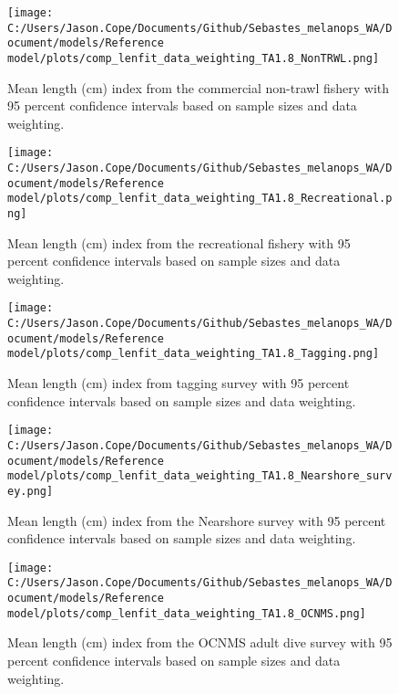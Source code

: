 \documentclass[11pt,
  english,
  letterpaper,
]{article}
\begin{document}
\pagebreak

\begin{figure}
\centering
\texttt{[image: C:/Users/Jason.Cope/Documents/Github/Sebastes\_melanops\_WA/Document/models/Reference model/plots/comp\_lenfit\_data\_weighting\_TA1.8\_NonTRWL.png]}
\caption{Mean length (cm) index from the commercial non-trawl fishery with 95 percent confidence intervals based on sample sizes and data weighting.\label{fig:nontrawl-mean-len-fit}}
\end{figure}

\pagebreak

\begin{figure}
\centering
\texttt{[image: C:/Users/Jason.Cope/Documents/Github/Sebastes\_melanops\_WA/Document/models/Reference model/plots/comp\_lenfit\_data\_weighting\_TA1.8\_Recreational.png]}
\caption{Mean length (cm) index from the recreational fishery with 95 percent confidence intervals based on sample sizes and data weighting.\label{fig:rec-mean-len-fit}}
\end{figure}

\pagebreak

\begin{figure}
\centering
\texttt{[image: C:/Users/Jason.Cope/Documents/Github/Sebastes\_melanops\_WA/Document/models/Reference model/plots/comp\_lenfit\_data\_weighting\_TA1.8\_Tagging.png]}
\caption{Mean length (cm) index from tagging survey with 95 percent confidence intervals based on sample sizes and data weighting.\label{fig:tag-mean-len-fit}}
\end{figure}

\pagebreak

\begin{figure}
\centering
\texttt{[image: C:/Users/Jason.Cope/Documents/Github/Sebastes\_melanops\_WA/Document/models/Reference model/plots/comp\_lenfit\_data\_weighting\_TA1.8\_Nearshore\_survey.png]}
\caption{Mean length (cm) index from the Nearshore survey with 95 percent confidence intervals based on sample sizes and data weighting.\label{fig:nearshore-mean-len-fit}}
\end{figure}

\pagebreak

\begin{figure}
\centering
\texttt{[image: C:/Users/Jason.Cope/Documents/Github/Sebastes\_melanops\_WA/Document/models/Reference model/plots/comp\_lenfit\_data\_weighting\_TA1.8\_OCNMS.png]}
\caption{Mean length (cm) index from the OCNMS adult dive survey with 95 percent confidence intervals based on sample sizes and data weighting.\label{fig:ocnms-mean-len-fit}}
\end{figure}
\end{document}
